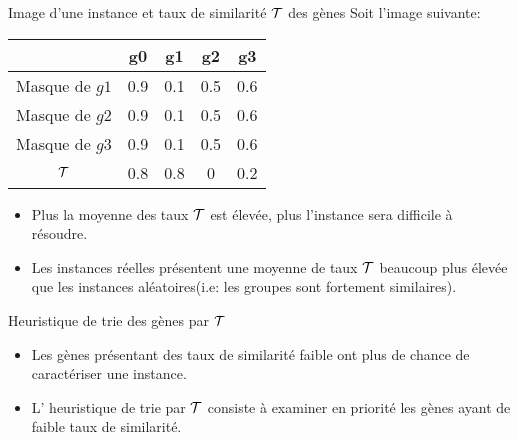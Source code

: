 \documentclass{beamer}
\begin{document}
\begin{frame}
	\begin{exampleblock}{Image d'une instance et taux de similarité $\cal{T}$ des gènes}
	Soit l'image suivante:
		\begin{center}
			\begin{tabular}{|c|c|c|c|c|}
			\hline 
			\backslashbox{Groupes}{Gènes} & g0 & g1 & g2 & g3 \\ 
			\hline 
			Masque de $g1$ & 0.9 & 0.1 & 0.5 & 0.6 \\ 
			\hline 
			Masque de $g2$ & 0.9 & 0.1 & 0.5 & 0.6 \\
			\hline 
			Masque de $g3$ & 0.9 & 0.1 & 0.5 & 0.6 \\
			\hline 
			\hline
			$\cal{T}$ & 0.8 & 0.8 & 0 & 0.2 \\ 
			\hline
			\end{tabular}
		\end{center}
	\end{exampleblock}
	
	\pause
	\begin{overprint}
		{
			\begin{itemize}
				\item<2-3> Plus la moyenne des taux $\cal{T}$ est élevée, plus l'instance sera difficile à résoudre.		
				\item<3> Les instances réelles présentent une moyenne de taux $\cal{T}$ beaucoup plus élevée que les instances aléatoires(i.e: les groupes sont fortement similaires).
			\end{itemize}
		}
		{
			\begin{block}{Heuristique de trie des gènes par $\cal{T}$}
				\begin{itemize}
					\item<4-5> Les gènes présentant des taux de similarité faible ont plus de chance de caractériser une instance.
					\item<5> L' heuristique de trie par $\cal{T}$ consiste à examiner en priorité les gènes ayant de faible taux de similarité.
				\end{itemize}
			\end{block}
		}
	\end{overprint}
\end{frame}
\end{document}
